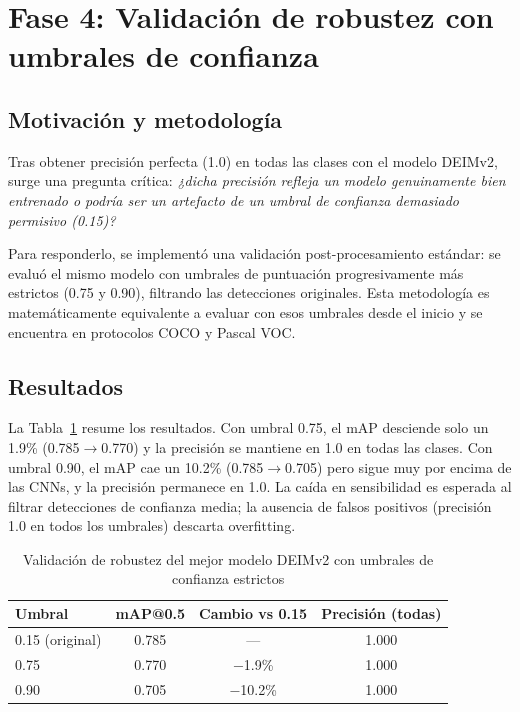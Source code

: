 \FloatBarrier
\section{Fase 4: Validación de robustez con umbrales de confianza}
\label{sec:fase4}

\subsection{Motivación y metodología}

Tras obtener precisión perfecta (1.0) en todas las clases con el modelo DEIMv2, surge una pregunta crítica: \textit{¿dicha precisión refleja un modelo genuinamente bien entrenado o podría ser un artefacto de un umbral de confianza demasiado permisivo (0.15)?}

Para responderlo, se implementó una validación post-procesamiento estándar: se evaluó el mismo modelo con umbrales de puntuación progresivamente más estrictos (0.75 y 0.90), filtrando las detecciones originales. Esta metodología es matemáticamente equivalente a evaluar con esos umbrales desde el inicio y se encuentra en protocolos COCO y Pascal VOC.

\subsection{Resultados}

La Tabla~\ref{tab:fase4_robustez} resume los resultados. Con umbral 0.75, el mAP desciende solo un 1.9\% (0.785$\rightarrow$0.770) y la precisión se mantiene en 1.0 en todas las clases. Con umbral 0.90, el mAP cae un 10.2\% (0.785$\rightarrow$0.705) pero sigue muy por encima de las CNNs, y la precisión permanece en 1.0. La caída en sensibilidad es esperada al filtrar detecciones de confianza media; la ausencia de falsos positivos (precisión 1.0 en todos los umbrales) descarta overfitting.

\begin{table}[htbp]
\centering
\begin{tabular}{lccc}
\toprule
\textbf{Umbral} & \textbf{mAP@0.5} & \textbf{Cambio vs 0.15} & \textbf{Precisión (todas)} \\
\midrule
0.15 (original) & 0.785 & --- & 1.000 \\
0.75 & 0.770 & $-$1.9\% & 1.000 \\
0.90 & 0.705 & $-$10.2\% & 1.000 \\
\bottomrule
\end{tabular}
\caption{Validación de robustez del mejor modelo DEIMv2 con umbrales de confianza estrictos}
\label{tab:fase4_robustez}
\end{table}

